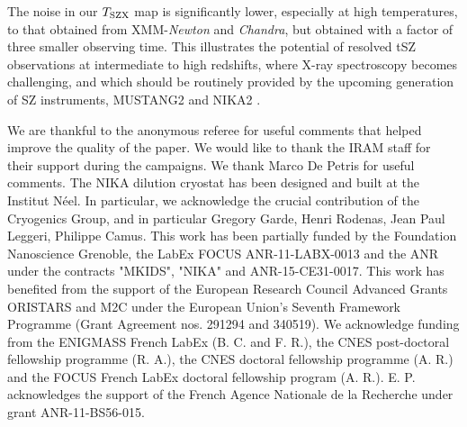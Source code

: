 \documentclass[twocolumn,traditabstract]{aa}
\def\TSZ {T_{\rm SZX}}
\begin{document}
The noise in our $\TSZ$ map is significantly lower, especially at high temperatures, to that obtained from XMM-\textit{Newton} and \textit{Chandra}, but obtained with a factor of three smaller observing time. This illustrates the potential of resolved tSZ observations at intermediate to high redshifts, where X-ray spectroscopy becomes challenging, and which should be routinely provided by the upcoming generation of SZ instruments, MUSTANG2 \citep{Dicker2014} and NIKA2 \citep{Calvo2016,Comis2016}.

\begin{acknowledgements}
We are thankful to the anonymous referee for useful comments that helped improve the quality of the paper.
We would like to thank the IRAM staff for their support during the campaigns. 
We thank Marco De Petris for useful comments.
The NIKA dilution cryostat has been designed and built at the Institut N\'eel. In particular, we acknowledge the crucial contribution of the Cryogenics Group, and in particular Gregory Garde, Henri Rodenas, Jean Paul Leggeri, Philippe Camus. 
This work has been partially funded by the Foundation Nanoscience Grenoble, the LabEx FOCUS ANR-11-LABX-0013 and the ANR under the contracts "MKIDS", "NIKA" and ANR-15-CE31-0017. 
This work has benefited from the support of the European Research Council Advanced Grants ORISTARS and M2C under the European Union's Seventh Framework Programme (Grant Agreement nos. 291294 and 340519).
We acknowledge funding from the ENIGMASS French LabEx (B. C. and F. R.), the CNES post-doctoral fellowship programme (R. A.), the CNES doctoral fellowship programme (A. R.) and the FOCUS French LabEx doctoral fellowship program (A. R.).
E. P. acknowledges the support of the French Agence Nationale de la Recherche under grant ANR-11-BS56-015.
\end{acknowledgements}



\appendix
\end{document}
